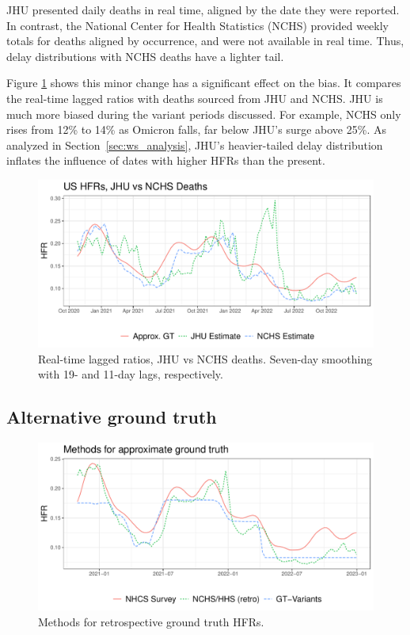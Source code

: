\documentclass{article}
\begin{document}
JHU presented daily deaths in real time, aligned by the date they were reported. In contrast, the National Center for Health Statistics (NCHS) provided weekly totals for deaths aligned by occurrence, and were not available in real time. Thus, delay distributions with NCHS deaths have a lighter tail. 

Figure \ref{fig:jhu_vs_nchs} shows this minor change has a significant effect on the bias. It compares the real-time lagged ratios with deaths sourced from JHU and NCHS. JHU is much more biased during the variant periods discussed. For example, NCHS only rises from 12\% to 14\% as Omicron falls, far below JHU's surge above 25\%. As analyzed in Section~\ref{sec:ws_analysis}, JHU's heavier-tailed delay distribution inflates the influence of dates with higher HFRs than the present.


\begin{figure}
    \centering
    \includegraphics[width=0.7\linewidth]{Figures/Real/jhu_vs_nchs.pdf}
    \caption{Real-time lagged ratios, JHU vs NCHS deaths. Seven-day smoothing with 19- and 11-day lags, respectively.}
    \label{fig:jhu_vs_nchs}
\end{figure}


\subsection{Alternative ground truth}
\label{apx:alt_gt}

\begin{figure}
    \centering
    \includegraphics[width=0.7\linewidth]{Figures/Real/ApproxGT.pdf}
    \caption{Methods for retrospective ground truth HFRs.}
    \label{fig:approxGT}
\end{figure}
\end{document}
